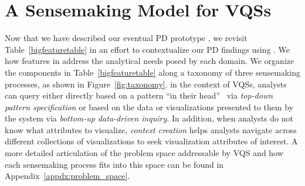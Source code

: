  \section{A Sensemaking Model for VQSs\label{sec:sensemaking}}
 Now that we have described our eventual PD prototype \zvpp, we revisit Table~\ref{bigfeaturetable} in an effort to contextualize our PD findings using . We  how features in \zvpp address the analytical needs posed by each domain. We organize the components in Table~\ref{bigfeaturetable} along a taxonomy of three sensemaking processes, as shown in Figure~\ref{fig:taxonomy}. %
in the context of VQSs, analysts can query either directly based on a pattern ``in their head''~\cite{Sedlmair2012} via \emph{top-down pattern specification} or based on the data or visualizations presented to them by the system via \emph{bottom-up data-driven inquiry}. In addition, when analysts do not know what attributes to visualize, \emph{context creation} helps analysts navigate across different collections of visualizations to seek visualization attributes of interest. A more detailed articulation of the problem space addressable by VQS and how each sensemaking process fits into this space can be found in Appendix~\ref{appdx:problem_space}.
